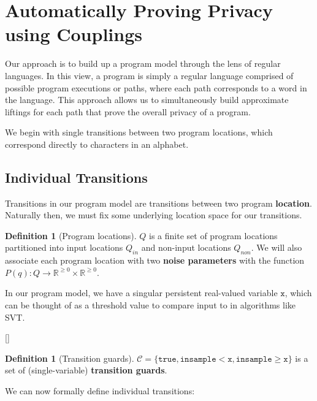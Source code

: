 \documentclass[12pt]{article}
\newcommand{\RR}{\mathbb{R}}
\newcommand{\gguard}[1][x]{\texttt{insample}\geq#1}
\newcommand{\lguard}[1][x]{\texttt{insample} < #1}
\theoremstyle{definition}
\newtheorem{defn}[thm]{Definition}
\begin{document}
\section{Automatically Proving Privacy using Couplings}

Our approach is to build up a program model through the lens of regular languages. In this view, a program is simply a regular language comprised of possible program executions or paths, where each path corresponds to a word in the language. This approach allows us to simultaneously build approximate liftings for each path that prove the overall privacy of a program.

We begin with single transitions between two program locations, which correspond directly to characters in an alphabet. 

\subsection{Individual Transitions}

Transitions in our program model are transitions between two program \textbf{location}. Naturally then, we must fix some underlying location space for our transitions. 

\begin{defn}[Program locations]
    $Q$ is a finite set of program locations partitioned into input locations $Q_{in}$ and non-input locations $Q_{non}$. We will also associate each program location with two \textbf{noise parameters} with the function $P(q): Q\to \RR^{\geq 0}\times \RR^{\geq 0}$.
\end{defn}

In our program model, we have a singular persistent real-valued variable $\texttt{x}$, which can be thought of as a threshold value to compare input to in algorithms like SVT.\@


[]


\begin{defn}[Transition guards]
    $\mathcal{C}=\{\texttt{true}, \lguard[\texttt{x}], \gguard[\texttt{x}]\}$ is a set of (single-variable) \textbf{transition guards}.
\end{defn}

We can now formally define individual transitions:
\end{document}
